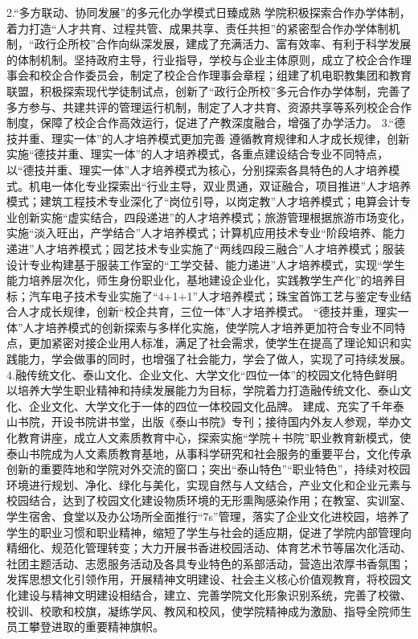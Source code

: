 2.“多方联动、协同发展”的多元化办学模式日臻成熟
学院积极探索合作办学体制，着力打造“人才共育、过程共管、成果共享、责任共担”的紧密型合作办学体制机制，“政行企所校”合作向纵深发展，建成了充满活力、富有效率、有利于科学发展的体制机制。坚持政府主导，行业指导，学校与企业主体原则，成立了校企合作理事会和校企合作委员会，制定了校企合作理事会章程；组建了机电职教集团和教育联盟，积极探索现代学徒制试点，创新了“政行企所校”多元合作办学体制，完善了多方参与、共建共评的管理运行机制，制定了人才共育、资源共享等系列校企合作制度，保障了校企合作高效运行，促进了产教深度融合，增强了办学活力。
3.“德技并重、理实一体”的人才培养模式更加完善
遵循教育规律和人才成长规律，创新实施“德技并重、理实一体”的人才培养模式，各重点建设结合专业不同特点，以“德技并重、理实一体”人才培养模式为核心，分别探索各具特色的人才培养模式。机电一体化专业探索出“行业主导，双业贯通，双证融合，项目推进”人才培养模式；建筑工程技术专业深化了“岗位引导，以岗定教”人才培养模式；电算会计专业创新实施“虚实结合，四段递进”的人才培养模式；旅游管理根据旅游市场变化，实施“淡入旺出，产学结合”人才培养模式；计算机应用技术专业“阶段培养、能力递进”人才培养模式；园艺技术专业实施了“两线四段三融合”人才培养模式；服装设计专业构建基于服装工作室的“工学交替、能力递进”人才培养模式，实现“学生能力培养层次化，师生身份职业化，基地建设企业化，实践教学生产化”的培养目标；汽车电子技术专业实施了“4+1+1”人才培养模式；珠宝首饰工艺与鉴定专业结合人才成长规律，创新“校企共育，三位一体”人才培养模式。
 “德技并重，理实一体”人才培养模式的创新探索与多样化实施，使学院人才培养更加符合专业不同特点，更加紧密对接企业用人标准，满足了社会需求，使学生在提高了理论知识和实践能力，学会做事的同时，也增强了社会能力，学会了做人，实现了可持续发展。
4.融传统文化、泰山文化、企业文化、大学文化“四位一体”的校园文化特色鲜明
以培养大学生职业精神和持续发展能力为目标，学院着力打造融传统文化、泰山文化、企业文化、大学文化于一体的四位一体校园文化品牌。
建成、充实了千年泰山书院，开设书院讲书堂，出版《泰山书院》专刊；接待国内外友人参观，举办文化教育讲座，成立人文素质教育中心，探索实施“学院＋书院”职业教育新模式，使泰山书院成为人文素质教育基地，从事科学研究和社会服务的重要平台，文化传承创新的重要阵地和学院对外交流的窗口；突出“泰山特色”“职业特色”，持续对校园环境进行规划、净化、绿化与美化，实现自然与人文结合，产业文化和企业元素与校园结合，达到了校园文化建设物质环境的无形熏陶感染作用；在教室、实训室、学生宿舍、食堂以及办公场所全面推行“7s”管理，落实了企业文化进校园，培养了学生的职业习惯和职业精神，缩短了学生与社会的适应期，促进了学院内部管理向精细化、规范化管理转变；大力开展书香进校园活动、体育艺术节等届次化活动、社团主题活动、志愿服务活动及各具专业特色的系部活动，营造出浓厚书香氛围；发挥思想文化引领作用，开展精神文明建设、社会主义核心价值观教育，将校园文化建设与精神文明建设相结合，建立、完善学院文化形象识别系统，完善了校徽、校训、校歌和校旗，凝练学风、教风和校风，使学院精神成为激励、指导全院师生员工攀登进取的重要精神旗帜。
